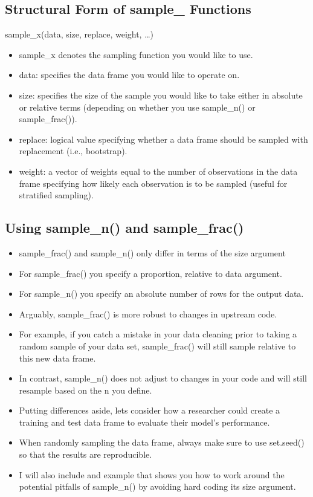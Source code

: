 \documentclass[]{book}
\providecommand{\tightlist}{%
  \setlength{\itemsep}{0pt}\setlength{\parskip}{0pt}}
\theoremstyle{definition}
\theoremstyle{definition}
\theoremstyle{definition}
\theoremstyle{remark}
\begin{document}
\hypertarget{structural-form-of-sample_-functions}{%
\subsection{Structural Form of sample\_ Functions}\label{structural-form-of-sample_-functions}}

sample\_x(data, size, replace, weight, \ldots{})

\begin{itemize}
\tightlist
\item
  sample\_x denotes the sampling function you would like to use.
\item
  data: specifies the data frame you would like to operate on.
\item
  size: specifies the size of the sample you would like to take either in absolute or relative terms (depending on whether you use sample\_n() or sample\_frac()).
\item
  replace: logical value specifying whether a data frame should be sampled with replacement (i.e., bootstrap).
\item
  weight: a vector of weights equal to the number of observations in the data frame specifying how likely each observation is to be sampled (useful for stratified sampling).
\end{itemize}

\hypertarget{using-sample_n-and-sample_frac}{%
\subsection{Using sample\_n() and sample\_frac()}\label{using-sample_n-and-sample_frac}}

\begin{itemize}
\tightlist
\item
  sample\_frac() and sample\_n() only differ in terms of the size argument
\item
  For sample\_frac() you specify a proportion, relative to data argument.
\item
  For sample\_n() you specify an absolute number of rows for the output data.
\item
  Arguably, sample\_frac() is more robust to changes in upstream code.
\item
  For example, if you catch a mistake in your data cleaning prior to taking a random sample of your data set, sample\_frac() will still sample relative to this new data frame.
\item
  In contrast, sample\_n() does not adjust to changes in your code and will still resample based on the n you define.
\item
  Putting differences aside, lets consider how a researcher could create a training and test data frame to evaluate their model's performance.
\item
  When randomly sampling the data frame, always make sure to use set.seed() so that the results are reproducible.
\item
  I will also include and example that shows you how to work around the potential pitfalls of sample\_n() by avoiding hard coding its size argument.
\end{itemize}
\end{document}
